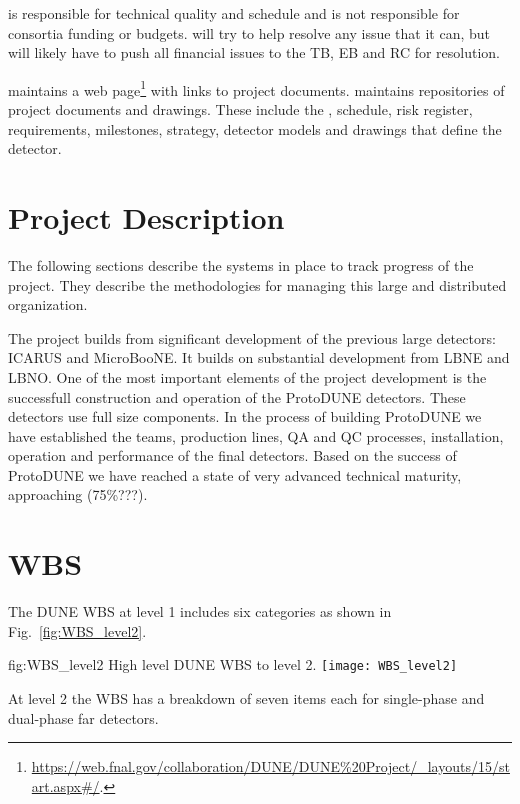  is responsible for technical quality and schedule and is not
responsible for consortia funding or budgets.   will try to help
resolve any issue that it can, but will likely have to push all
financial issues to the TB, EB and RC for resolution.

 maintains a web
page\footnote{\url{https://web.fnal.gov/collaboration/DUNE/DUNE\%20Project/\_layouts/15/start.aspx\#/}.}
with links to project documents.  maintains repositories of
project documents and drawings. These include the ,
schedule, risk register, requirements, milestones, strategy, detector
models and drawings that define the  detector.

\section{ Project Description}

The following sections describe the systems in place to track progress
of the  project. They describe the methodologies for
managing this large and distributed organization.

The  project builds from significant development of the
previous large  detectors: ICARUS and MicroBooNE. It
builds on substantial development from LBNE and LBNO. One of the most
important elements of the project development is the successfull
construction and operation of the ProtoDUNE detectors. These detectors
use full size  components. In the process of building
ProtoDUNE we have established the teams, production lines, QA and QC
processes, installation, operation and performance of the final
 detectors. Based on the success of ProtoDUNE we have
reached a state of very advanced technical maturity, approaching
(75\%???).

\section{WBS}
\label{sec:fdsp-coord-wbs}

The DUNE WBS at level 1 includes six categories as shown in
Fig.~\ref{fig:WBS_level2}.
\begin{dunefigure}{fig:WBS_level2}
  {High level DUNE WBS to level 2.}
  \texttt{[image: WBS\_level2]}
\end{dunefigure}
At level 2 the WBS has a breakdown of seven items
each for single-phase and dual-phase far detectors.

